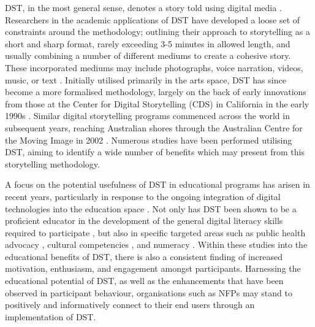 DST, in the most general sense, denotes a story told using digital media \cite{de2017digital}. Researchers in the academic applications of DST have developed a loose set of constraints around the methodology; outlining their approach to storytelling as a short and sharp format, rarely exceeding 3-5 minutes in allowed length, and usually combining a number of different mediums to create a cohesive story. These incorporated mediums may include photographs, voice narration, videos, music, or text \cite{gubrium2014situated}. Initially utilised primarily in the arts space, DST has since become a more formalised methodology, largely on the back of early innovations from those at the Center for Digital Storytelling (CDS) in California in the early 1990s \cite{lambert2009all}. Similar digital storytelling programs commenced across the world in subsequent years, reaching Australian shores through the Australian Centre for the Moving Image in 2002 \cite{hartley2009story}. Numerous studies have been performed utilising DST, aiming to identify a wide number of benefits which may present from this storytelling methodology.

A focus on the potential usefulness of DST in educational programs has arisen in recent years, particularly in response to the ongoing integration of digital technologies into the education space \cite{stanley2018digital}. Not only has DST been shown to be a proficient educator in the development of the general digital literacy skills required to participate \cite{niemi2016digital}, but also in specific targeted areas such as public health advocacy \cite{de2018using}, cultural competencies \cite{grant2016digital}, and numeracy \cite{niemi2018digital}. Within these studies into the educational benefits of DST, there is also a consistent finding of increased motivation, enthusiasm, and engagement amongst participants. Harnessing the educational potential of DST, as well as the enhancements that have been observed in participant behaviour, organisations such as NFPs may stand to positively and informatively connect to their end users through an implementation of DST.

